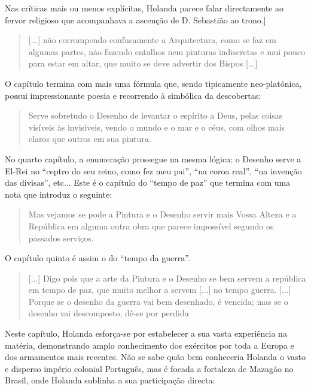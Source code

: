 \documentclass{article}
\begin{document}
Nas críticas mais ou menos explícitas, Holanda parece falar
directamente ao fervor religioso que acompanhava a ascenção de
D. Sebastião ao trono.]\cite[fl.38r]{holanda}

\begin{quote}
  [...] não corrompendo confusamente a Arquitectura, como se faz em
  algumas partes, não fazendo entalhos nem pinturas indiscretas e mui
  pouco para estar em altar, que muito se deve advertir dos Bispos
  [...] 
\end{quote}

O capítulo termina com mais uma fórmula que, sendo tipicamente
neo-platónica, possui impressionante poesia e recorrendo à
simbólica da descobertas:

\begin{quote}
  Serve sobretudo o Desenho de levantar o espírito a Deus, pelas
  coisas visíveis às invisíveis, vendo o mundo e o mar e o céus, com
  olhos mais claros que outros em sua pintura.
\end{quote}

No quarto capítulo, a enumeração prossegue na mesma lógica: o Desenho
serve a El-Rei no ``ceptro do seu reino, como fez meu pai'', ``na
coroa real'', ``na invenção das divisas'', etc... Este é o capítulo do
``tempo de paz'' que termina com uma nota que introduz o
seguinte:\cite[fl.41v]{holanda}

\begin{quote}
  Mas vejamos se pode a Pintura e o Desenho servir mais Vossa Alteza e
  a República em alguma outra obra que parece impossível segundo os
  passados serviços.
\end{quote}

O capítulo quinto é assim o do ``tempo da
guerra''.\cite[fl.42r]{holanda}

\begin{quote}
  [...] Digo pois que a arte da Pintura e o Desenho se bem servem a
  república em tempo de paz, que muito melhor a servem [...] no tempo
  guerra. [...] Porque se o desenho da guerra vai bem desenhado, é
  vencida; mas se o desenho vai descomposto, dê-se por perdida
\end{quote}

Neste capítulo, Holanda esforça-se por estabelecer a sua vasta
experiência na matéria, demonstrando amplo conhecimento dos exércitos
por toda a Europa e dos armamentos mais recentes. Não se sabe quão bem
conheceria Holanda o vasto e disperso império colonial Português, mas
é focada a fortaleza de Mazagão no Brasil, onde Holanda sublinha a sua
participação directa:
\end{document}
